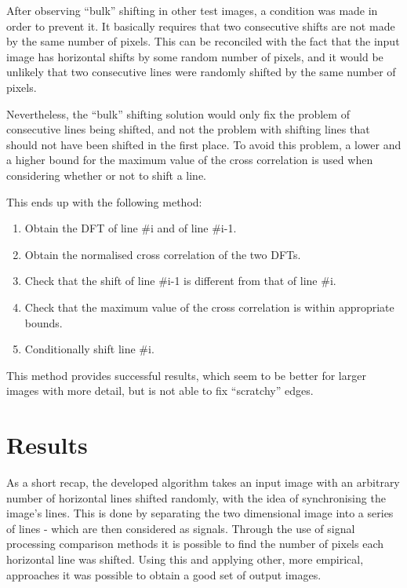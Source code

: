 \documentclass[a4paper,12pt]{article}
\begin{document}
After observing ``bulk'' shifting in other test images, a condition was made in order to prevent it. It basically requires that two consecutive shifts are not made by the same number of pixels. This can be reconciled with the fact that the input image has horizontal shifts by some random number of pixels, and it would be unlikely that two consecutive lines were randomly shifted by the same number of pixels. 

Nevertheless, the ``bulk'' shifting solution would only fix the problem of consecutive lines being shifted, and not the problem with shifting lines that should not have been shifted in the first place. To avoid this problem, a lower and a higher bound for the maximum value of the cross correlation is used when considering whether or not to shift a line. 

This ends up with the following method:

\begin{enumerate}
 \item Obtain the DFT of line \#i and of line \#i-1.
 \item Obtain the normalised cross correlation of the two DFTs.
 \item Check that the shift of line \#i-1 is different from that of line \#i.
 \item Check that the maximum value of the cross correlation is within appropriate bounds.
 \item Conditionally shift line \#i. 
\end{enumerate}

This method provides successful results, which seem to be better for larger images with more detail, but is not able to fix ``scratchy'' edges.

\section{Results}

As a short recap, the developed algorithm takes an input image with an arbitrary number of horizontal lines shifted randomly, with the idea of synchronising the image's lines. This is done by separating the two dimensional image into a series of lines - which are then considered as signals. Through the use of signal processing comparison methods it is possible to find the number of pixels each horizontal line was shifted. Using this and applying other, more empirical, approaches it was possible to obtain a good set of output images. 
\end{document}
